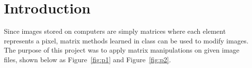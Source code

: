 \section*{Introduction}
  Since images stored on computers are simply matrices where each element
  represents a pixel, matrix methods learned in class can be used to
  modify images. The purpose of this project was to apply matrix manipulations
  on given image files, shown below as Figure~\ref{fig:p1} and
  Figure~\ref{fig:p2}.
